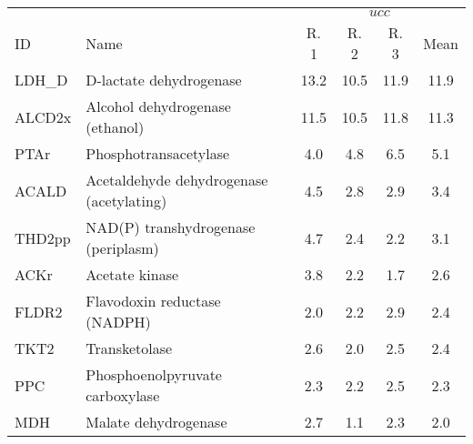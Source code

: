 \begin{tabular}{llcccc}
\toprule
        &                                        &  \multicolumn{4}{c}{$ucc$}      \\
\multirow{-2}{*}{ID} &    \multirow{-2}{*}{Name} &    R. 1 &    R. 2 &    R. 3                  &  Mean \\
\midrule
LDH\_D  &  D-lactate dehydrogenase & 13.2 & 10.5 & 11.9 & 11.9 \\
ALCD2x &  Alcohol dehydrogenase (ethanol) & 11.5 & 10.5 & 11.8 & 11.3 \\
PTAr   &  Phosphotransacetylase & 4.0 & 4.8 & 6.5 & 5.1 \\
ACALD  &  Acetaldehyde dehydrogenase (acetylating) & 4.5 & 2.8 & 2.9 & 3.4 \\
THD2pp &  NAD(P) transhydrogenase (periplasm) & 4.7 & 2.4 & 2.2 & 3.1 \\
ACKr   &  Acetate kinase & 3.8 & 2.2 & 1.7 & 2.6 \\
FLDR2  &  Flavodoxin reductase (NADPH) & 2.0 & 2.2 & 2.9 & 2.4 \\
TKT2   &  Transketolase & 2.6 & 2.0 & 2.5 & 2.4 \\
PPC    &  Phosphoenolpyruvate carboxylase & 2.3 & 2.2 & 2.5 & 2.3 \\
MDH    &  Malate dehydrogenase & 2.7 & 1.1 & 2.3 & 2.0 \\
\hline
\end{tabular}%
